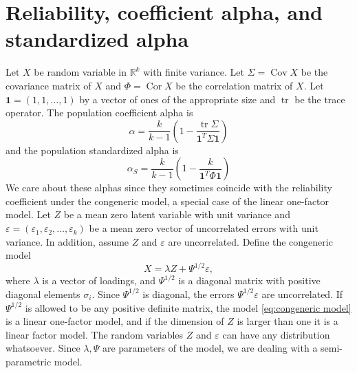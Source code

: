 \documentclass[twoside]{article}
\DeclareMathOperator{\tr}{tr}
\DeclareMathOperator{\Cor}{Cor}
\DeclareMathOperator{\Cov}{Cov}
\begin{document}

\section{Reliability, coefficient alpha, and standardized alpha}
\label{sec:coefficienta alpha}

Let $X$ be random variable in $\mathbb{R}^{k}$ with finite variance.
Let $\Sigma=\Cov X$ be the covariance matrix of $X$ and $\Phi=\Cor X$
be the correlation matrix of $X$. Let $\boldsymbol{1}=(1,1,\ldots,1)$ by a vector of ones of the appropriate size and $\tr$ be the trace operator.
The population coefficient alpha \citep[][eq. 2]{cronbach1951coefficient} is
\begin{equation}
\alpha =  \frac{k}{k-1}\left(1-\frac{\tr\Sigma}{\boldsymbol{1}^{T}\Sigma\boldsymbol{1}}\right)\label{eq:Coefficient alpha}
\end{equation}
and the population standardized alpha \citep[][eq. 2]{Falk2011-ae} is
\begin{equation}
\alpha_S=\frac{k}{k-1}\left(1-\frac{k}{\boldsymbol{1}^{T}\Phi\boldsymbol{1}}\right)\label{eq:standardized alpha}
\end{equation}
We care about these alphas since they sometimes coincide with the reliability coefficient under the congeneric model, a special case of the linear one-factor model. Let $Z$ be a mean zero latent variable with unit variance and $\varepsilon=(\varepsilon_{1},\varepsilon_{2},\ldots,\varepsilon_{k})$
be a mean zero vector of uncorrelated errors with unit variance. In addition, assume $Z$ and $\varepsilon$ are uncorrelated. Define the congeneric model
\begin{equation}
X=\lambda Z+\Psi^{1/2}\varepsilon,\label{eq:congeneric model}
\end{equation}
where $\lambda$ is a vector of loadings, and $\Psi^{1/2}$ is a diagonal matrix with positive diagonal elements $\sigma_i$. Since $\Psi^{1/2}$ is diagonal, the errors $\Psi^{1/2}\varepsilon$ are uncorrelated. If $\Psi^{1/2}$ is allowed to be any positive definite matrix, the model \eqref{eq:congeneric model} is a linear one-factor model, and if the dimension of $Z$ is larger than one it is a linear factor model. The random variables $Z$ and $\varepsilon$ can have any distribution whatsoever. Since $\lambda,\Psi$ are parameters of the model, we are dealing with a semi-parametric model. 
\end{document}
